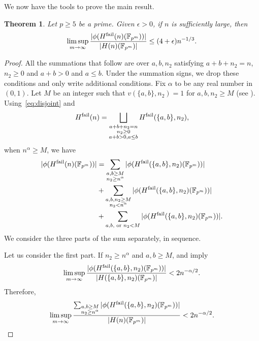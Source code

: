 \documentclass{amsart}
\numberwithin{equation}{section} \numberwithin{figure}{section}
\newcommand\FF{\mathbb{F}}
\theoremstyle{one}
\newtheorem{theorem}{\textbf{Theorem}}[section]
\theoremstyle{definition}
\begin{document}
We now have the tools to prove the main result.
\begin{theorem}\label{thm: failbound general n}
  Let \(p \geq 5\) be a prime.
    Given \(\epsilon > 0\), if \(n\) is sufficiently large, then 
  \[ \limsup_{m \to \infty} \frac{|\phi(H^{\rm fail}(n)(\FF_{p^m}))|}{|H(n)(\FF_{p^m})|} \leq (4+\epsilon) n^{-1/3}.\]
\end{theorem}
\begin{proof}
  All the summations that follow are over \(a,b,n_2\) satisfying \(a+b+n_2 = n\), $n_2\geq 0$ and \(a+b > 0\) and \(a \leq b\).
  Under the summation signs, we drop these conditions and only write additional conditions.
  Fix \(\alpha\) to be any real number in \((0,1)\).
  Let \(M\) be an integer such that \(v(\{a,b\},n_2) = 1\) for \(a,b,n_2 \geq M\) (see ).
  Using~\eqref{eq:disjoint} and
  \[H^{\rm fail}(n) = \bigsqcup_{\substack{a+b+n_2 = n\\ n_2\geq 0 \\ a+b > 0, a \leq b}} H^{\rm fail}(\{a,b\},n_2),\]
  when $n^\alpha\geq M$, we have
  \begin{equation}\label{eqn:3parts}
    \begin{split}
      |\phi(H^{\rm fail}(n)(\FF_{p^m}))| &= \sum_{\substack{a,b \geq M\\ n_2 \geq n^{\alpha}}}|\phi(H^{\rm fail}(\{a,b\},n_2)(\FF_{p^m}))| \\
                                        &+ \sum_{\substack{a, b, n_2 \geq M\\ n_2 < n^{\alpha}}} |\phi (H^{\rm fail}(\{a,b\},n_2)(\FF_{p^m}))| \\
                                        &+ \sum_{a,b,\text{ or } n_2 < M} |\phi (H^{\rm fail}(\{a,b\},n_2)(\FF_{p^m}))|.
    \end{split}
\end{equation}
We consider the three parts of the sum separately, in sequence.

  Let us consider the first part.
  If \(n_2 \geq n^{\alpha}\) and \(a,b \geq M\),  and  imply 
  \[ \limsup_{m \to \infty} \frac{|\phi(H^{\rm fail}(\{a,b\},n_2)(\FF_{p^m}))|}{|H(\{a,b\},n_2)(\FF_{p^m})|}  < 2 n^{-\alpha/2} .\]
  Therefore,    \begin{equation}\label{eqn:part1}
    \limsup_{m \to \infty} \frac{\sum_{\substack{a,b \geq M\\ n_2 \geq n^{\alpha}}}|\phi(H^{\rm fail}(\{a,b\},n_2)(\FF_{p^m}))|}{|H(n)(\FF_{p^m})|}  < 2 n^{-\alpha/2} .
  \end{equation}


\end{proof}
\end{document}
